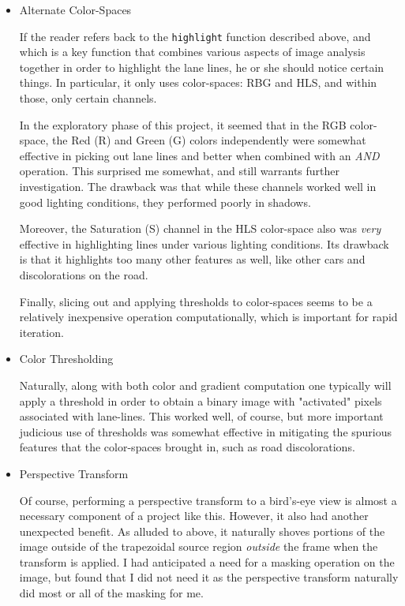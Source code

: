 \documentclass[11pt]{article}
\begin{document}
\begin{itemize}
\item Alternate Color-Spaces
\label{sec-1-3-1-1}

If the reader refers back to the \texttt{highlight} function
described above, and which is a key function that combines
various aspects of image analysis together in order to
highlight the lane lines, he or she should notice certain
things.  In particular, it only uses color-spaces:  RBG and
HLS, and within those, only certain channels.  

In the exploratory phase of this project, it seemed that in
the RGB color-space, the Red (R) and Green (G) colors
independently were somewhat effective in picking out lane
lines and better when combined with an \emph{AND} operation.  This
surprised me somewhat, and still warrants further
investigation.  The drawback was that while these channels
worked well in good lighting conditions, they performed poorly
in shadows.  

Moreover, the Saturation (S) channel in the HLS color-space
also was \emph{very} effective in highlighting lines under various
lighting conditions.  Its drawback is that it highlights too
many other features as well, like other cars and
discolorations on the road.  

Finally, slicing out and applying thresholds to color-spaces
seems to be a relatively inexpensive operation
computationally, which is important for rapid iteration.

\item Color Thresholding
\label{sec-1-3-1-2}

Naturally, along with both color and gradient computation one
typically will apply a threshold in order to obtain a binary
image with "activated" pixels associated with lane-lines.
This worked well, of course, but more important judicious use
of thresholds was somewhat effective in mitigating the
spurious features that the color-spaces brought in, such as
road discolorations.

\item Perspective Transform
\label{sec-1-3-1-3}

Of course, performing a perspective transform to a bird's-eye
view is almost a necessary component of a project like this.
However, it also had another unexpected benefit.  As alluded
to above, it naturally shoves portions of the image outside of
the trapezoidal source region \emph{outside} the frame when the
transform is applied.  I had anticipated a need for a masking
operation on the image, but found that I did not need it as
the perspective transform naturally did most or all of the
masking for me.  


\end{itemize}
\end{document}
